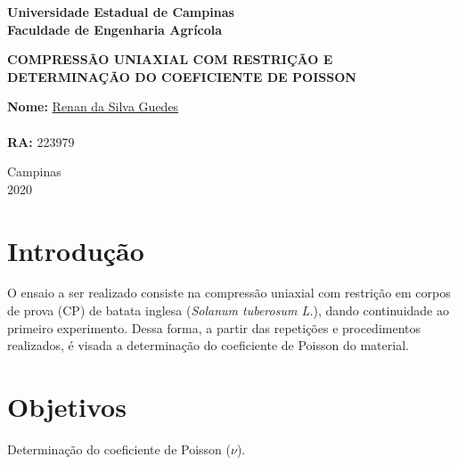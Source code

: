 \documentclass[a4paper, 12pt, brazilian]{article}
\begin{document}
	\begin{titlepage}
		\begin{center}
			\begin{large}
				\textbf{Universidade Estadual de Campinas}\\\vspace{.5cm}
				\textbf{Faculdade de Engenharia Agrícola}\\\vspace{10.5cm}
			\end{large}
			\begin{large}
				\uppercase{\textbf{Compressão Uniaxial com Restrição e determinação do coeficiente de Poisson}}\\\vspace{4cm}
			\end{large}
		\end{center}
		\begin{large}
			\noindent\textbf{Nome:} \href{https://github.com/RenanSGuedes/576}{Renan da Silva Guedes}\\\\
			\noindent\textbf{RA:} 223979\\\vspace{4cm}
		\end{large}
		\begin{center}
			\begin{large}
				Campinas\\\vspace{.3cm}
				2020
			\end{large}
		\end{center}
	\end{titlepage}
	
	\newpage
	
	\section{Introdução}
	
	O ensaio a ser realizado consiste na compressão uniaxial com restrição em corpos de prova (CP) de batata inglesa (\textit{Solanum tuberosum L.}), dando continuidade ao primeiro experimento. Dessa forma, a partir das repetições e procedimentos realizados, é visada a determinação do coeficiente de Poisson do material.
	
	\section{Objetivos}
	
	Determinação do coeficiente de Poisson ($\nu$).
	
\end{document}
